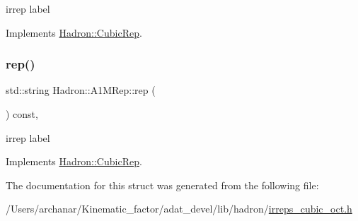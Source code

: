 irrep label 

Implements \mbox{\hyperlink{structHadron_1_1CubicRep_ac3eb63608803d44c68681f158e14eb1b}{Hadron\+::\+Cubic\+Rep}}.

\mbox{\label{structHadron_1_1A1MRep_ace32cdcf9819db0556ec88464d828e6f}} 
\subsubsection{\texorpdfstring{rep()}{rep()}\hspace{0.1cm}{\footnotesize\ttfamily [2/2]}}
{\footnotesize\ttfamily std\+::string Hadron\+::\+A1\+M\+Rep\+::rep (\begin{DoxyParamCaption}{ }\end{DoxyParamCaption}) const\hspace{0.3cm}{\ttfamily [inline]}, {\ttfamily [virtual]}}

irrep label 

Implements \mbox{\hyperlink{structHadron_1_1CubicRep_ac3eb63608803d44c68681f158e14eb1b}{Hadron\+::\+Cubic\+Rep}}.



The documentation for this struct was generated from the following file\+:\begin{DoxyCompactItemize}
\item 
/\+Users/archanar/\+Kinematic\+\_\+factor/adat\+\_\+devel/lib/hadron/\mbox{\hyperlink{lib_2hadron_2irreps__cubic__oct_8h}{irreps\+\_\+cubic\+\_\+oct.\+h}}\end{DoxyCompactItemize}
